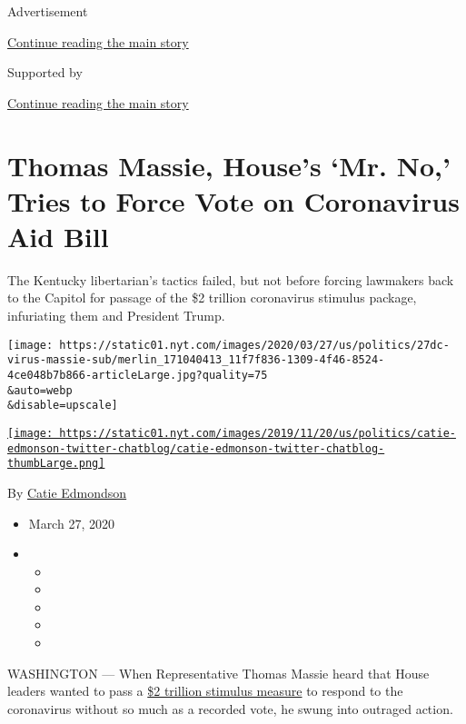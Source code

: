Advertisement

\protect\hyperlink{after-top}{Continue reading the main story}

Supported by

\protect\hyperlink{after-sponsor}{Continue reading the main story}

\hypertarget{thomas-massie-houses-mr-no-tries-to-force-vote-on-coronavirus-aid-bill}{%
\section{Thomas Massie, House's `Mr. No,' Tries to Force Vote on
Coronavirus Aid
Bill}\label{thomas-massie-houses-mr-no-tries-to-force-vote-on-coronavirus-aid-bill}}

The Kentucky libertarian's tactics failed, but not before forcing
lawmakers back to the Capitol for passage of the \$2 trillion
coronavirus stimulus package, infuriating them and President Trump.

\texttt{[image: https://static01.nyt.com/images/2020/03/27/us/politics/27dc-virus-massie-sub/merlin\_171040413\_11f7f836-1309-4f46-8524-4ce048b7b866-articleLarge.jpg?quality=75\\\&auto=webp\\\&disable=upscale]}

\href{https://www.nytimes.com/by/catie-edmondson}{\texttt{[image: https://static01.nyt.com/images/2019/11/20/us/politics/catie-edmonson-twitter-chatblog/catie-edmonson-twitter-chatblog-thumbLarge.png]}}

By \href{https://www.nytimes.com/by/catie-edmondson}{Catie Edmondson}

\begin{itemize}
\item
  March 27, 2020
\item
  \begin{itemize}
  \item
  \item
  \item
  \item
  \item
  \end{itemize}
\end{itemize}

WASHINGTON --- When Representative Thomas Massie heard that House
leaders wanted to pass a
\href{https://www.nytimes.com/2020/03/26/us/coronavirus-senate-stimulus-package.html?action=click\&module=Top\%20Stories\&pgtype=Homepage\&action=click\&module=RelatedLinks\&pgtype=Article}{\$2
trillion stimulus measure} to respond to the coronavirus without so much
as a recorded vote, he swung into outraged action.


